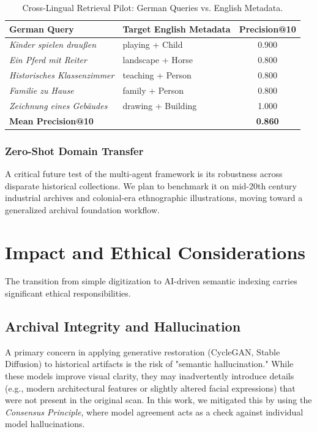 \documentclass[12pt,onecolumn,a4paper]{IEEEtran}
\begin{document}
\begin{table}[!htbp]
\centering
\caption{Cross-Lingual Retrieval Pilot: German Queries vs. English Metadata.}
\label{tab:cross_lingual}
\begin{tabular}{llc}
\toprule
German Query & Target English Metadata & Precision@10 \\
\midrule
\textit{Kinder spielen draußen} & playing + Child & 0.900 \\
\textit{Ein Pferd mit Reiter} & landscape + Horse & 0.800 \\
\textit{Historisches Klassenzimmer} & teaching + Person & 0.800 \\
\textit{Familie zu Hause} & family + Person & 0.800 \\
\textit{Zeichnung eines Gebäudes} & drawing + Building & 1.000 \\
\midrule
\multicolumn{2}{l}{\textbf{Mean Precision@10}} & \textbf{0.860} \\
\bottomrule
\end{tabular}
\end{table}

\subsubsection{Zero-Shot Domain Transfer}
A critical future test of the multi-agent framework is its robustness across disparate historical collections. We plan to benchmark it on mid-20th century industrial archives and colonial-era ethnographic illustrations, moving toward a generalized archival foundation workflow.

\clearpage
\section{Impact and Ethical Considerations}
The transition from simple digitization to AI-driven semantic indexing carries significant ethical responsibilities. 

\subsection{Archival Integrity and Hallucination}
A primary concern in applying generative restoration (CycleGAN, Stable Diffusion) to historical artifacts is the risk of "semantic hallucination." While these models improve visual clarity, they may inadvertently introduce details (e.g., modern architectural features or slightly altered facial expressions) that were not present in the original scan. In this work, we mitigated this by using the \textit{Consensus Principle}, where model agreement acts as a check against individual model hallucinations. 
\end{document}
